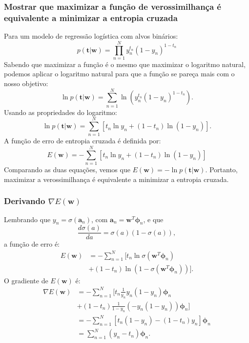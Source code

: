 \documentclass[conference]{IEEEtran}
\begin{document}
\subsubsection{Mostrar que maximizar a função de verossimilhança é equivalente a minimizar a entropia cruzada}
Para um modelo de regressão logística com alvos binários:
\[
p(\mathbf{t} | \mathbf{w}) = \prod_{n=1}^{N} y_n^{t_n} (1 - y_n)^{1 - t_n}
\]
Sabendo que maximizar a função é o mesmo que maximizar o logaritmo natural, podemos aplicar o logaritmo natural para que a função se pareça mais com o nosso objetivo:
\[
\ln p(\mathbf{t} | \mathbf{w}) = \sum_{n=1}^{N} \ln \left( y_n^{t_n} (1 - y_n)^{1 - t_n} \right).
\]
Usando as propriedades do logaritmo:
\[
\ln p(\mathbf{t} | \mathbf{w}) = \sum_{n=1}^{N} \left[ t_n \ln y_n + (1 - t_n) \ln(1 - y_n) \right].
\]
A função de erro de entropia cruzada é definida por:
\begin{equation*}
  E(\mathbf{w}) = -\sum_{n=1}^{N} \left[ t_n \ln y_n + (1 - t_n) \ln(1 - y_n) \right]
\end{equation*}
Comparando as duas equações, vemos que $E(\mathbf{w}) = -\ln p(\mathbf{t} | \mathbf{w})$. Portanto, maximizar a verossimilhança é equivalente a minimizar a entropia cruzada.\\

\subsubsection[Derivando gradiente de E(w)]{Derivando $\nabla E(\mathbf{w})$}
Lembrando que $y_n = \sigma(\mathbf{a}_n)$, com $\mathbf{a}_n = \mathbf{w}^T \boldsymbol{\phi}_n$, e que
\[
\frac{d\sigma(a)}{da} = \sigma(a)(1 - \sigma(a)),
\]
a função de erro é:
\begin{align*}
E(\mathbf{w})
&= -\sum_{n=1}^{N} [ t_n \ln \sigma(\mathbf{w}^T \boldsymbol{\phi}_n) \\ 
&+ (1 - t_n) \ln(1 - \sigma(\mathbf{w}^T \boldsymbol{\phi}_n)) ].
\end{align*}
O gradiente de $E(\mathbf{w})$ é:
\begin{align*}
\nabla E(\mathbf{w}) 
&= -\sum_{n=1}^{N} [ t_n \frac{1}{y_n} y_n (1 - y_n) \boldsymbol{\phi}_n \\ &+ (1 - t_n) \frac{1}{1 - y_n} (-y_n (1 - y_n)) \boldsymbol{\phi}_n ] \\
&= -\sum_{n=1}^{N} \left[ t_n (1 - y_n) - (1 - t_n) y_n \right] \boldsymbol{\phi}_n \\
&= \sum_{n=1}^{N} (y_n - t_n) \boldsymbol{\phi}_n.
\end{align*}
\end{document}
